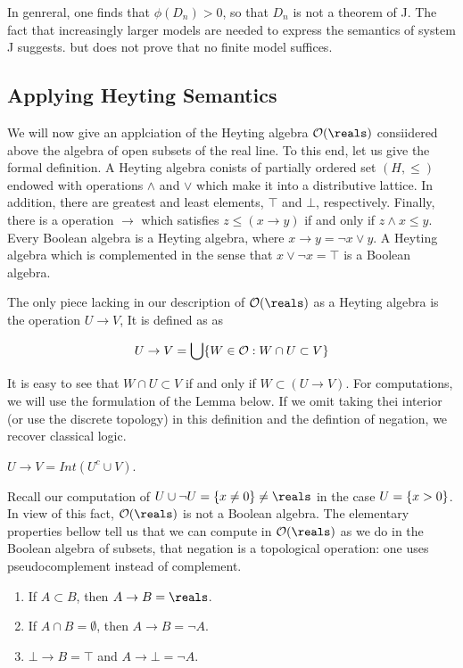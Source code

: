 In genreral, one finds that $\phi(D_n) > 0$, so that  $D_n$ is not a theorem of J.
The fact that increasingly larger models are needed to express the semantics of system J suggests. but does not prove that no finite model suffices.

\subsection{Applying Heyting Semantics}

We will now give an applciation of the Heyting algebra $\opensets(\reals)$ consiidered above \mdash the algebra of open subsets of the real line.  To this end, let us give the formal definition. A Heyting algebra conists of partially ordered set $(H, \le)$ endowed with operations $\land$ and $\lor$ which make it into a distributive lattice.  In addition, there are greatest and least elements, $\top$ and $\bot$, respectively.  Finally, there is a operation $\to$ which satisfies $z \le (x \to y)$ if and only if $z \land x \le y$.  Every Boolean algebra is a Heyting algebra, where $x \to y = \neg x \lor y$.  A Heyting algebra which is complemented in the sense that $x \lor \neg x = \top$ is a Boolean algebra.

The only piece lacking in our description of  $\opensets(\reals)$ as a Heyting algebra
is the operation $U \to V$,  It is defined as as

$$
U \to V = \bigcup \{ W\in \mathcal{O} : W \cap U \subset V  \}
$$

It is easy to see that $W \cap U \subset V$ if and only if $W \subset (U \to V)$.  For computations, we will use the formulation of the Lemma below.  If we omit taking thei interior  (or use the discrete topology) in this definition and the defintion of negation, we recover classical logic.

\begin{lemma}
$U \to V = Int(U^c \cup V)$.
\end{lemma}

Recall our computation of $U \cup \neg U = \set{ x \ne 0 } \ne \reals$ in the case $U = \{  x > 0 \}$.  In view of this fact, $\opensets(\reals)$ is not a Boolean algebra.
The elementary properties bellow tell us that we can compute in $\opensets(\reals)$ as we do in the Boolean algebra of subsets,  that negation is a topological operation: one uses pseudocomplement instead of complement.



\begin{enumerate}

\item  If $A \subset B$, then $A \to B = \reals$.

\item If $A \cap B = \emptyset$, then $A \to B = \neg A$.

\item $\bot \to B = \top$ and $A \to \bot = \neg A$.

\end{enumerate}

